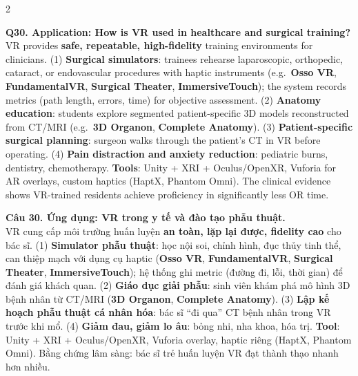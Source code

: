 \begin{paracol}{2}
\switchcolumn*

\textbf{Q30. Application: How is VR used in healthcare and surgical training?}\\
VR provides \textbf{safe, repeatable, high-fidelity} training environments for clinicians. (1) \textbf{Surgical simulators}: trainees rehearse laparoscopic, orthopedic, cataract, or endovascular procedures with haptic instruments (e.g.\ \textbf{Osso VR}, \textbf{FundamentalVR}, \textbf{Surgical Theater}, \textbf{ImmersiveTouch}); the system records metrics (path length, errors, time) for objective assessment. (2) \textbf{Anatomy education}: students explore segmented patient-specific 3D models reconstructed from CT/MRI (e.g.\ \textbf{3D Organon}, \textbf{Complete Anatomy}). (3) \textbf{Patient-specific surgical planning}: surgeon walks through the patient's CT in VR before operating. (4) \textbf{Pain distraction and anxiety reduction}: pediatric burns, dentistry, chemotherapy. \textbf{Tools}: Unity + XRI + Oculus/OpenXR, Vuforia for AR overlays, custom haptics (HaptX, Phantom Omni). The clinical evidence shows VR-trained residents achieve proficiency in significantly less OR time.

\switchcolumn

\textbf{Câu 30. Ứng dụng: VR trong y tế và đào tạo phẫu thuật.}\\
VR cung cấp môi trường huấn luyện \textbf{an toàn, lặp lại được, fidelity cao} cho bác sĩ. (1) \textbf{Simulator phẫu thuật}: học nội soi, chỉnh hình, đục thủy tinh thể, can thiệp mạch với dụng cụ haptic (\textbf{Osso VR}, \textbf{FundamentalVR}, \textbf{Surgical Theater}, \textbf{ImmersiveTouch}); hệ thống ghi metric (đường đi, lỗi, thời gian) để đánh giá khách quan. (2) \textbf{Giáo dục giải phẫu}: sinh viên khám phá mô hình 3D bệnh nhân từ CT/MRI (\textbf{3D Organon}, \textbf{Complete Anatomy}). (3) \textbf{Lập kế hoạch phẫu thuật cá nhân hóa}: bác sĩ ``đi qua'' CT bệnh nhân trong VR trước khi mổ. (4) \textbf{Giảm đau, giảm lo âu}: bỏng nhi, nha khoa, hóa trị. \textbf{Tool}: Unity + XRI + Oculus/OpenXR, Vuforia overlay, haptic riêng (HaptX, Phantom Omni). Bằng chứng lâm sàng: bác sĩ trẻ huấn luyện VR đạt thành thạo nhanh hơn nhiều.

\switchcolumn*


\end{paracol}

